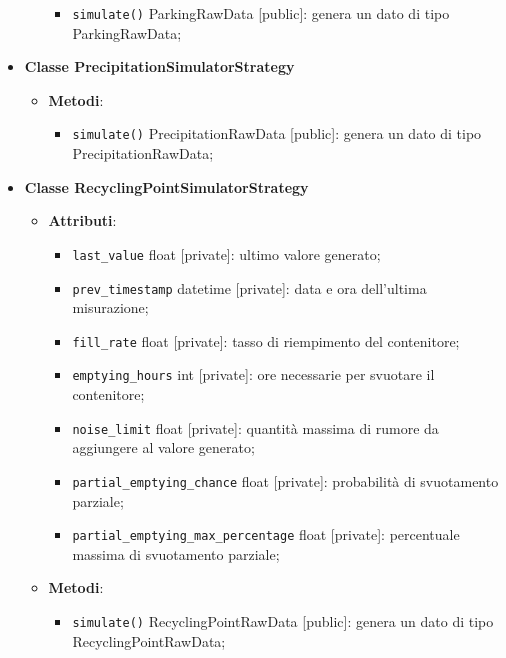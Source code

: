 \begin{itemize}
\begin{itemize}
		            \begin{itemize}
			            \item \texttt{simulate()} ParkingRawData [public]: genera un dato di tipo ParkingRawData;
		            \end{itemize}
	      \end{itemize}
	\item \textbf{Classe PrecipitationSimulatorStrategy}
	      \begin{itemize}
		      \item \textbf{Metodi}:
		            \begin{itemize}
			            \item \texttt{simulate()} PrecipitationRawData [public]: genera un dato di tipo\\ PrecipitationRawData;
		            \end{itemize}
	      \end{itemize}
	\item \textbf{Classe RecyclingPointSimulatorStrategy}
	      \begin{itemize}
		      \item \textbf{Attributi}:
		            \begin{itemize}
			            \item \texttt{last\_value} float [private]: ultimo valore generato;
			            \item \texttt{prev\_timestamp} datetime [private]: data e ora dell'ultima misurazione;
			            \item \texttt{fill\_rate} float [private]: tasso di riempimento del contenitore;
			            \item \texttt{emptying\_hours} int [private]: ore necessarie per svuotare il contenitore;
			            \item \texttt{noise\_limit} float [private]: quantità massima di rumore da aggiungere al valore generato;
			            \item \texttt{partial\_emptying\_chance} float [private]: probabilità di svuotamento parziale;
			            \item \texttt{partial\_emptying\_max\_percentage} float [private]: percentuale massima di svuotamento parziale;
		            \end{itemize}
		      \item \textbf{Metodi}:
		            \begin{itemize}
			            \item \texttt{simulate()} RecyclingPointRawData [public]: genera un dato di tipo\\ RecyclingPointRawData;

\end{itemize}
\end{itemize}
\end{itemize}
